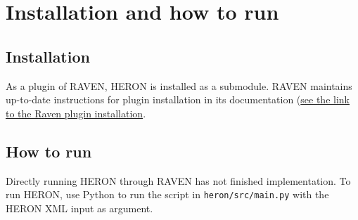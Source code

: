 \section{ Installation and how to run}

\subsection{Installation}
As a plugin of RAVEN, HERON is installed as a submodule. RAVEN maintains up-to-date instructions for
plugin installation in its documentation
(\href{https://github.com/idaholab/raven/wiki/Plugins}{see the link to the Raven plugin
installation}.

\subsection{How to run}
Directly running HERON through RAVEN has not finished implementation. To run HERON, use Python to
run the script in \texttt{heron/src/main.py} with the HERON XML input as argument.
